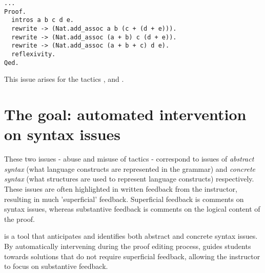 \begin{verbatim}
...
Proof.  
  intros a b c d e.  
  rewrite -> (Nat.add_assoc a b (c + (d + e))).  
  rewrite -> (Nat.add_assoc (a + b) c (d + e)).  
  rewrite -> (Nat.add_assoc (a + b + c) d e).  
  reflexivity.
Qed.
\end{verbatim}
This issue arises for the tactics ,  and .

\section{The goal: automated intervention on syntax issues}
These two issues - abuse and misuse of tactics - correspond to issues of \emph{abstract syntax} (what language constructs are represented in the grammar) and \emph{concrete syntax} (what structures are used to represent language constructs) respectively. These issues are often highlighted in written feedback from the instructor, resulting in much 'superficial' feedback. Superficial feedback is comments on syntax issues, whereas substantive feedback is comments on the logical content of the proof.

 is a tool that anticipates and identifies both abstract and concrete syntax issues. By automatically intervening during the proof editing process,  guides students towards solutions that do not require superficial feedback, allowing the instructor to focus on substantive feedback.